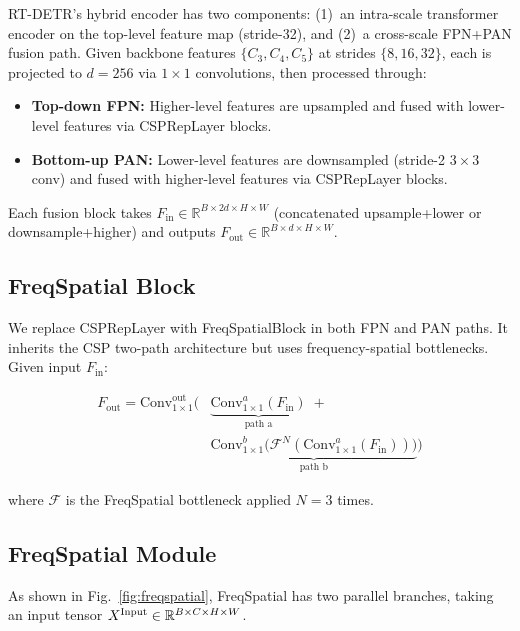 \documentclass[10pt,twocolumn]{IEEEtran}
\begin{document}
RT-DETR's hybrid encoder has two components: (1)~an intra-scale transformer
encoder on the top-level feature map (stride-32), and (2)~a cross-scale FPN+PAN
fusion path. Given backbone features $\{C_3, C_4, C_5\}$ at strides
$\{8, 16, 32\}$, each is projected to $d=256$ via $1\times1$ convolutions,
then processed through:

\begin{itemize}
\item \textbf{Top-down FPN:} Higher-level features are upsampled and fused with lower-level
  features via CSPRepLayer blocks.
\item \textbf{Bottom-up PAN:} Lower-level features are downsampled (stride-2 $3\times3$
  conv) and fused with higher-level features via CSPRepLayer blocks.
\end{itemize}

Each fusion block takes $F_{\text{in}} \in \mathbb{R}^{B \times 2d \times H \times W}$
(concatenated upsample+lower or downsample+higher) and outputs
$F_{\text{out}} \in \mathbb{R}^{B \times d \times H \times W}$.

\subsection{FreqSpatial Block}
\label{sec:block}

We replace CSPRepLayer with FreqSpatialBlock in both FPN and PAN paths.
It inherits the CSP two-path architecture but uses frequency-spatial
bottlenecks. Given input $F_{\text{in}}$:

\begin{equation}
\label{eq:csp}
\begin{aligned}
F_{\text{out}} = \text{Conv}_{1\times1}^{\text{out}}\Big(
&\underbrace{\text{Conv}_{1\times1}^{a}(F_{\text{in}})}_{\text{path a}} \;+ \\
&\underbrace{\text{Conv}_{1\times1}^{b}\big(\mathcal{F}^N(\text{Conv}_{1\times1}^{a}(F_{\text{in}}))\big)}_{\text{path b}}\Big)
\end{aligned}
\end{equation}

where $\mathcal{F}$ is the FreqSpatial bottleneck applied $N=3$ times.

\subsection{FreqSpatial Module}
\label{sec:module}

As shown in Fig.~\ref{fig:freqspatial}, FreqSpatial has two parallel branches,
taking an input tensor $X^{\rm Input} \in \mathbb{R}^{B \times C \times H \times W}$.
\end{document}
